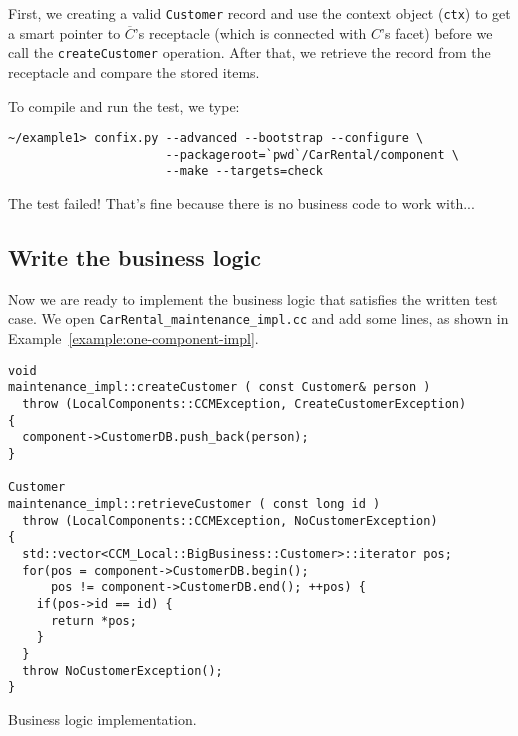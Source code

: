 First, we creating a valid {\tt Customer} record and  
use the context object ({\tt ctx}) to get a smart pointer
to $\overline{C}$'s receptacle (which is connected with $C$'s facet) 
before we call the {\tt createCustomer} operation. 
After that, we retrieve the record from the receptacle and compare the stored 
items.

To compile and run the test, we type:
\begin{small}
\begin{verbatim}
~/example1> confix.py --advanced --bootstrap --configure \
                      --packageroot=`pwd`/CarRental/component \
                      --make --targets=check
\end{verbatim}
\end{small}
The test failed! 
That's fine because there is no business code to work with...






\subsection{Write the business logic}

Now we are ready to implement the business logic that satisfies the written test
case. We open {\tt CarRental\_maintenance\_impl.cc} and add some lines, as 
shown in Example~\ref{example:one-component-impl}.

\begin{Example}
\begin{minifbox}
\begin{small}
\begin{verbatim}
void
maintenance_impl::createCustomer ( const Customer& person )
  throw (LocalComponents::CCMException, CreateCustomerException)
{
  component->CustomerDB.push_back(person);
}

Customer
maintenance_impl::retrieveCustomer ( const long id )
  throw (LocalComponents::CCMException, NoCustomerException)
{
  std::vector<CCM_Local::BigBusiness::Customer>::iterator pos;
  for(pos = component->CustomerDB.begin(); 
      pos != component->CustomerDB.end(); ++pos) {
    if(pos->id == id) {
      return *pos;
    }
  }
  throw NoCustomerException();
}
\end{verbatim}
\end{small}
\end{minifbox}
\caption{Business logic implementation.}
\label{example:one-component-impl}
\end{Example}

